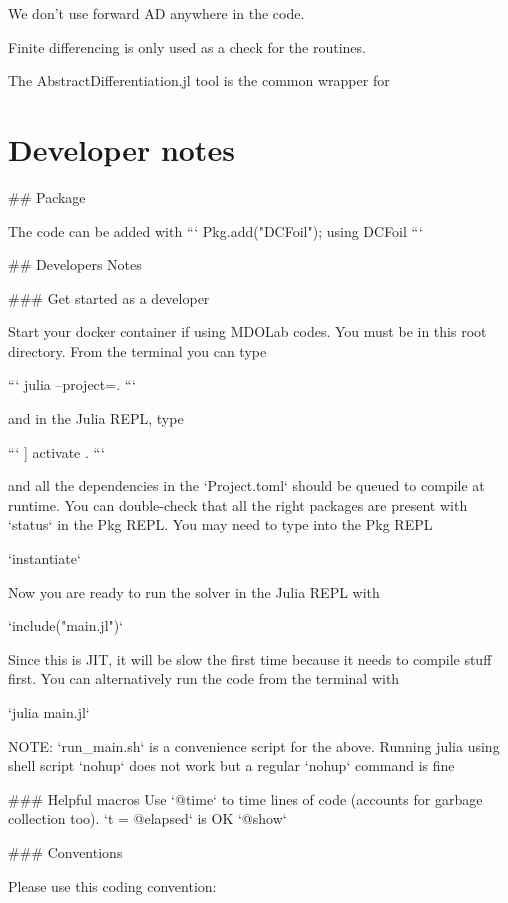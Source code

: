 \documentclass[10pt]{article}
\begin{document}
We don't use forward AD anywhere in the code.

Finite differencing is only used as a check for the routines.

The AbstractDifferentiation.jl tool is the common wrapper for


\onecolumn
\appendix


\section{Developer notes}
## Package

The code can be added with
```
Pkg.add("DCFoil"); using DCFoil
```

## Developers Notes

### Get started as a developer

Start your docker container if using MDOLab codes.
You must be in this root directory. From the terminal you can type

```
julia --project=.
```

and in the Julia REPL, type

```
] activate .
```

and all the dependencies in the `Project.toml` should be queued to compile at runtime.
You can double-check that all the right packages are present with `status` in the Pkg REPL.
You may need to type into the Pkg REPL

`instantiate`

Now you are ready to run the solver in the Julia REPL with

`include("main.jl")`

Since this is JIT, it will be slow the first time because it needs to compile stuff first.
You can alternatively run the code from the terminal with

`julia main.jl`

NOTE:
`run_main.sh` is a convenience script for the above. Running julia using shell script `nohup` does not work but a regular `nohup` command is fine

### Helpful macros
Use `@time` to time lines of code (accounts for garbage collection too).
`t = @elapsed` is OK
`@show`

### Conventions

Please use this coding convention:
\end{document}
